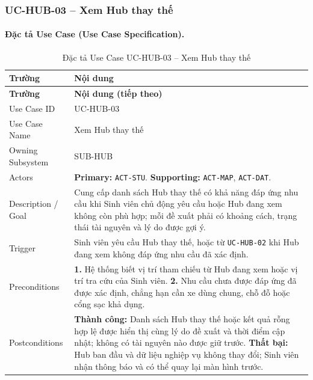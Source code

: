 \clearpage
\subsubsection{UC-HUB-03 -- Xem Hub thay thế}


\paragraph{Đặc tả Use Case (Use Case Specification).}
\small
\begin{longtable}{|L{42mm}|L{102mm}|}
  \caption{Đặc tả Use Case UC-HUB-03 -- Xem Hub thay thế}\label{tab:spec-UC-HUB-03}\\
  \hline
  \centering\arraybackslash\textbf{Trường} & \centering\arraybackslash\textbf{Nội dung}\\
  \hline
  \endfirsthead
  \hline
  \centering\arraybackslash\textbf{Trường} & \centering\arraybackslash\textbf{Nội dung (tiếp theo)}\\
  \hline
  \endhead
  Use Case ID & UC-HUB-03\\\hline
  Use Case Name & Xem Hub thay thế\\\hline
  Owning Subsystem & SUB-HUB\\\hline
  Actors & \textbf{Primary:} \texttt{ACT-STU}. \textbf{Supporting:} \texttt{ACT-MAP}, \texttt{ACT-DAT}.\\\hline
  Description / Goal & Cung cấp danh sách Hub thay thế có khả năng đáp ứng nhu cầu khi Sinh viên chủ động yêu cầu hoặc Hub đang xem không còn phù hợp; mỗi đề xuất phải có khoảng cách, trạng thái tài nguyên và lý do được gợi ý.\\\hline
  Trigger & Sinh viên yêu cầu Hub thay thế, hoặc từ \texttt{UC-HUB-02} khi Hub đang xem không đáp ứng nhu cầu đã xác định.\\\hline
  Preconditions &
    \textbf{1.} Hệ thống biết vị trí tham chiếu từ Hub đang xem hoặc vị trí tra cứu của Sinh viên.\newline
    \textbf{2.} Nhu cầu chưa được đáp ứng đã được xác định, chẳng hạn cần xe dùng chung, chỗ đỗ hoặc cổng sạc khả dụng.\\\hline
  Postconditions &
    \textbf{Thành công:} Danh sách Hub thay thế hoặc kết quả rỗng hợp lệ được hiển thị cùng lý do đề xuất và thời điểm cập nhật; không có tài nguyên nào được giữ trước.\newline
    \textbf{Thất bại:} Hub ban đầu và dữ liệu nghiệp vụ không thay đổi; Sinh viên nhận thông báo và có thể quay lại màn hình trước.\\\hline

\end{longtable}
